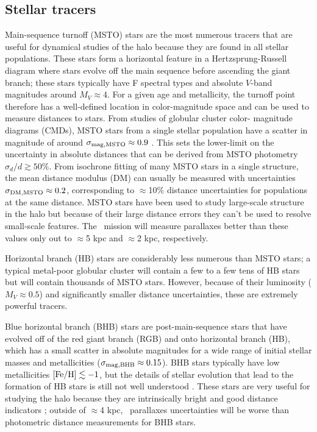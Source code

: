 \subsection{Stellar tracers}

Main-sequence turnoff (MSTO) stars are the most numerous tracers that are useful
for dynamical studies of the halo because they are found in all stellar
populations. These stars form a horizontal feature in a Hertzsprung-Russell
diagram where stars evolve off the main sequence before ascending the giant
branch; these stars typically have F spectral types and absolute $V$-band
magnitudes around $M_V \approx 4$. For a given age and metallicity, the turnoff
point therefore has a well-defined location in color-magnitude space and can be
used to measure distances to stars. From studies of globular cluster color-
magnitude diagrams (CMDs), MSTO stars from a single stellar population have a
scatter in magnitude of around $\sigma_{\rm mag,MSTO} \approx 0.9$
\citep{bell08, bell10}. This sets the lower-limit on the uncertainty in absolute
distances that can be derived from MSTO photometry $\sigma_{d}/d \gtrsim 50\%$.
From isochrone fitting of many MSTO stars in a single structure, the mean
distance modulus (DM) can usually be measured with uncertainties $\sigma_{\rm
DM,MSTO} \approx 0.2$, corresponding to $\approx$10\% distance uncertainties for
populations at the same distance. MSTO stars have been used to study large-scale
structure in the halo \citep[e.g.,][]{newberg02} but because of their large
distance errors they can't be used to resolve small-scale features. The \gaia\
mission will measure parallaxes better than these values only out to $\approx$5
kpc and $\approx$2 kpc, respectively.

Horizontal branch (HB) stars are considerably less numerous than MSTO stars; a
typical metal-poor globular cluster will contain a few to a few tens of HB stars
but will contain thousands of MSTO stars. However, because of their luminosity
($M_V \approx 0.5$) and significantly smaller distance uncertainties, these are
extremely powerful tracers.

Blue horizontal branch (BHB) stars are post-main-sequence stars that have
evolved off of the red giant branch (RGB) and onto horizontal branch (HB), which
has a small scatter in absolute magnitudes for a wide range of initial stellar
masses and metallicities ($\sigma_{\rm mag,BHB} \approx 0.15$). BHB stars
typically have low metallicities ${[{\rm Fe}/{\rm H}]} \lesssim -1$, but the details of stellar
evolution that lead to the formation of HB stars is still not well understood
\citep{percival11}. These stars are very useful for studying the halo because
they are intrinsically bright and good distance indicators \cite[$\sigma_{d}/d
\approx 10\%$; see, e.g.,][]{xue08, deason11}; outside of $\approx$4 kpc, \gaia\
parallaxes uncertainties will be worse than photometric distance measurements
for BHB stars.

